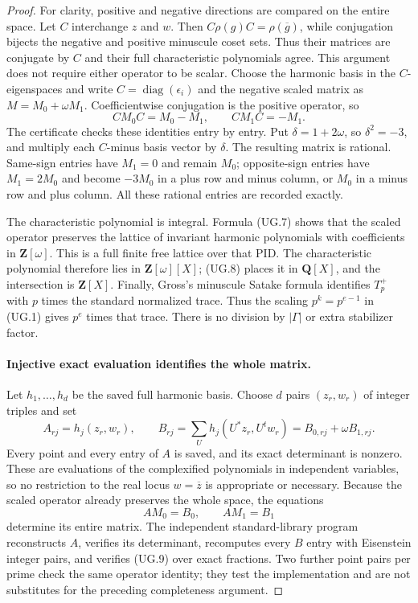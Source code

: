 \documentclass[11pt,a4paper]{article}
\theoremstyle{definition}
\begin{document}
\begin{proof}
For clarity, positive and negative directions are compared on
the entire space. Let $C$ interchange $z$ and $w$. Then
$C\rho(g)C=\rho(\overline g)$, while conjugation bijects the
negative and positive minuscule coset sets. Thus their matrices
are conjugate by $C$ and their full characteristic polynomials
agree. This argument does not require either operator to be scalar.
Choose the harmonic basis in the $C$-eigenspaces and write
$C=\operatorname{diag}(\epsilon_i)$ and the negative scaled
matrix as $M=M_0+\omega M_1$. Coefficientwise conjugation is the
positive operator, so
\[
 CM_0C=M_0-M_1,\qquad CM_1C=-M_1.
 \tag{UG.8}
\]
The certificate checks these identities entry by entry.
Put $\delta=1+2\omega$, so $\delta^2=-3$, and multiply each
$C$-minus basis vector by $\delta$. The resulting matrix is
rational. Same-sign entries have $M_1=0$ and remain $M_0$;
opposite-sign entries have $M_1=2M_0$ and become $-3M_0$ in
a plus row and minus column, or $M_0$ in a minus row and plus
column. All these rational entries are recorded exactly.

The characteristic polynomial is integral. Formula (UG.7) shows
that the scaled operator preserves the lattice of invariant
harmonic polynomials with coefficients in $\mathbf Z[\omega]$.
This is a full finite free lattice over that PID. The
characteristic polynomial therefore lies in $\mathbf Z[\omega][X]$;
(UG.8) places it in $\mathbf Q[X]$, and the intersection is
$\mathbf Z[X]$.
Finally, Gross's minuscule Satake formula
\cite[\S3, (3.13)--(3.14), p.~8]{K17GrossSatake1998}
identifies $T_p^+$ with $p$ times the standard normalized trace.
Thus the scaling $p^k=p^{e-1}$ in (UG.1) gives $p^e$ times that
trace. There is no division by $|\Gamma|$ or extra stabilizer factor.

\paragraph{Injective exact evaluation identifies the whole matrix.}
Let $h_1,\ldots,h_d$ be the saved full harmonic basis. Choose $d$
pairs $(z_r,w_r)$ of integer triples and set
\[
 A_{rj}=h_j(z_r,w_r),\qquad
 B_{rj}=\sum_U h_j(U^*z_r,U^tw_r)=B_{0,rj}+\omega B_{1,rj}.
\]
Every point and every entry of $A$ is saved, and its exact
determinant is nonzero. These are evaluations of the complexified
polynomials in independent variables, so no restriction to the
real locus $w=\overline z$ is appropriate or necessary.
Because the scaled operator already preserves the whole space,
the equations
\[
 AM_0=B_0,\qquad AM_1=B_1
 \tag{UG.9}
\]
determine its entire matrix. The independent standard-library
program reconstructs $A$, verifies its determinant, recomputes
every $B$ entry with Eisenstein integer pairs, and verifies
(UG.9) over exact fractions. Two further point pairs per prime
check the same operator identity; they test the implementation
and are not substitutes for the preceding completeness argument.


\end{proof}
\end{document}

